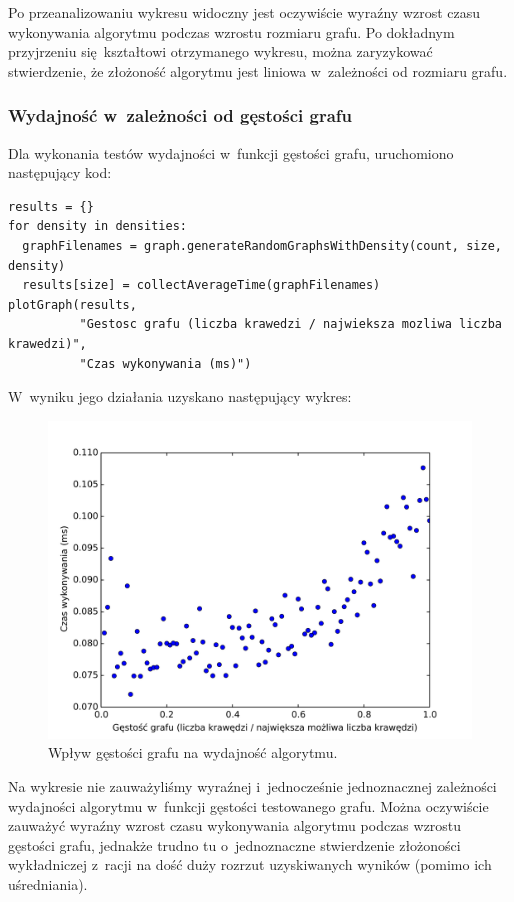 \documentclass[11pt,a4paper]{article}
\begin{document}
Po przeanalizowaniu wykresu widoczny jest oczywiście wyraźny wzrost czasu wykonywania algorytmu podczas wzrostu rozmiaru grafu. Po dokładnym przyjrzeniu się kształtowi otrzymanego wykresu, można zaryzykować stwierdzenie, że złożoność algorytmu jest liniowa w~zależności od rozmiaru grafu.

\newpage
\subsubsection{Wydajność w~zależności od gęstości grafu}
Dla wykonania testów wydajności w~funkcji gęstości grafu, uruchomiono następujący kod:\\

\begin{lstlisting}[caption = Testy wydajności w~zależności od gęstości grafu]
results = {}
for density in densities:
  graphFilenames = graph.generateRandomGraphsWithDensity(count, size, density)
  results[size] = collectAverageTime(graphFilenames)
plotGraph(results,
          "Gestosc grafu (liczba krawedzi / najwieksza mozliwa liczba krawedzi)",
          "Czas wykonywania (ms)")
\end{lstlisting}

W~wyniku jego działania uzyskano następujący wykres:

\begin{figure}[H]
\includegraphics[trim = 0mm 2mm 0mm 12mm, clip, width=14cm]{img/density.pdf}
\caption{Wpływ gęstości grafu na wydajność algorytmu.}
\end{figure}

Na wykresie nie zauważyliśmy wyraźnej i~jednocześnie jednoznacznej zależności wydajności algorytmu w~funkcji gęstości testowanego grafu. Można oczywiście zauważyć wyraźny wzrost czasu wykonywania algorytmu podczas wzrostu gęstości grafu, jednakże trudno tu o~jednoznaczne stwierdzenie złożoności wykładniczej z~racji na dość duży rozrzut uzyskiwanych wyników (pomimo ich uśredniania).
\end{document}

